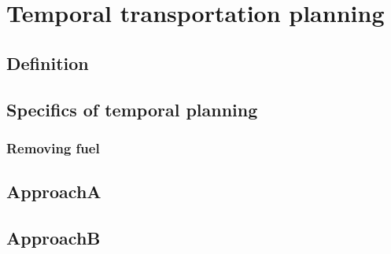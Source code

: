 \chapter{Temporal transportation planning}

\section{Definition}

\section{Specifics of temporal planning}

\subsection{Removing fuel}

\section{ApproachA}

\section{ApproachB}

